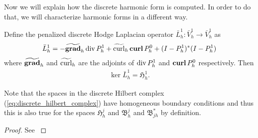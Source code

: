 \documentclass[../master_thesis.tex]{subfiles}
\begin{document}
Now we will explain how the discrete harmonic form is computed.
In order to do that, we will characterize harmonic forms in a different way.
\begin{proposition}
    Define the penalized discrete Hodge Laplacian operator $\bar{L}^1_h: \bar{V}^1_h \rightarrow \bar{V}^1_h$ as
    \begin{align*}
        \bar{L}^1_h = -\widetilde{\bm{\grad}}_h \diver P^1_h + \widetilde{\curl}_h \veccurl P ^0_h
            + (I - P^1_h)^* (I-P^1_h)
    \end{align*}
    where $\widetilde{\bm{\grad}}_h$ and $\widetilde{\operatorname{curl}}_h$ are the adjoints 
    of $\operatorname{div} P^1_h$ and $\veccurl P^0_h$ respectively. 
    Then 
    \begin{align*}
        \ker \bar{L}^1_h = \mathfrak{H}^1_h.
    \end{align*}
\end{proposition}
Note that the spaces in the discrete Hilbert complex (\ref{eq:discrete_hilbert_complex}) 
have homogeneous boundary conditions and thus 
this is also true for the spaces $\mathfrak{H}^j_h$ and $\mathfrak{B}^j_h$ and 
$\mathfrak{B}^*_{jh}$ by definition.
\begin{proof}
    See \cite[Thm.\,3.2]{broken_hodge_laplace_problems}
\end{proof}
\end{document}
